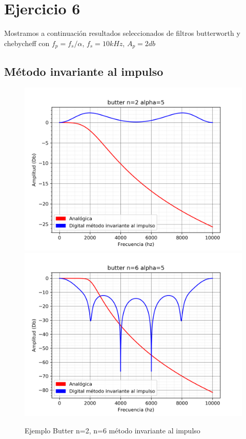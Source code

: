 \documentclass[assd_guia_filtros_recursivos_main.tex]{subfiles}
\begin{document}
\section{Ejercicio 6}
Mostramos a continuación resultados seleccionados de filtros butterworth y chebycheff con
$f_p=f_s/\alpha$, $f_s=10kHz$, $A_p=2db$


\subsection{Método invariante al impulso}

\begin{figure}[H]	
	\centering
	\includegraphics[scale=0.4]{output/butter/alpha=5/butter_n=2.png}
	\includegraphics[scale=0.4]{output/butter/alpha=5/butter_n=6.png}
	\caption{Ejemplo Butter n=2, n=6 método invariante al impulso}
	\label{fig:Caso 1}
\end{figure}
\end{document}
